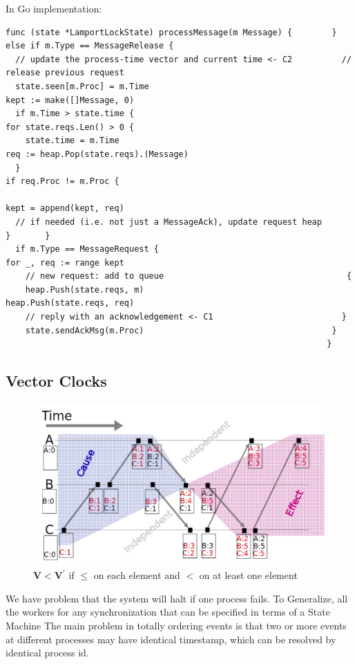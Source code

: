 \documentclass[acmlarge]{acmart}
\begin{document}
In Go implementation:

\begin{lstlisting}
func (state *LamportLockState) processMessage(m Message) {        } else if m.Type == MessageRelease {       
  // update the process-time vector and current time <- C2          // release previous request       
  state.seen[m.Proc] = m.Time                                       kept := make([]Message, 0)               
  if m.Time > state.time {                                          for state.reqs.Len() > 0 {             
    state.time = m.Time                                              req := heap.Pop(state.reqs).(Message)         
  }                                                                   if req.Proc != m.Proc {                           
                                                                      kept = append(kept, req) 
  // if needed (i.e. not just a MessageAck), update request heap      }       }      
  if m.Type == MessageRequest {                                     for _, req := range kept 
    // new request: add to queue                                     {                      
    heap.Push(state.reqs, m)                                          heap.Push(state.reqs, req)                   
    // reply with an acknowledgement <- C1                          }                                     
    state.sendAckMsg(m.Proc)                                      }
                                                                 }      
  \end{lstlisting}

\subsection{Vector Clocks}
\begin{figure}[h]
  \centering
  \includegraphics[width=0.5\linewidth]{vec_lock.png}
  \caption{$\mathbf{V}<\mathbf{V}^{\prime}$ if $\leq$ on each element and $<$ on at least one element}
\end{figure}
We have problem that the system will halt if one process fails. To Generalize, all the workers for any synchronization that can be specified in terms of a State Machine
The main problem in totally ordering events is that two or more events at different processes may have identical timestamp, which can be resolved by identical process id.
\end{document}
